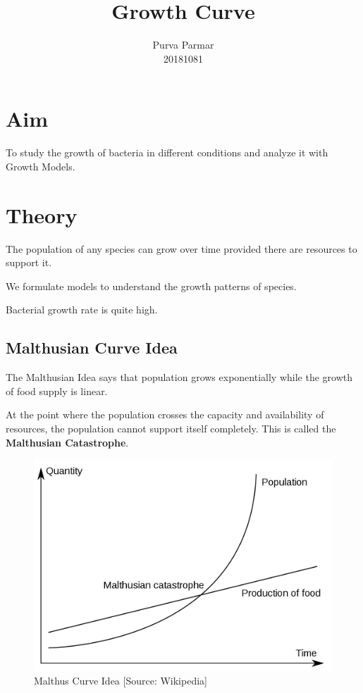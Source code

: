 \documentclass[twocolumn]{article}
\title{Growth Curve}
\author{Purva Parmar \\ 20181081}
\date{}
\begin{document}
\graphicspath{{../}}
\setlength{\parindent}{0pt}
\setlength{\parskip}{\baselineskip}

\maketitle

\section{Aim}

To study the growth of bacteria in different conditions and analyze it with Growth Models.

\section{Theory}

The population of any species can grow over time provided there are resources to support it. 

We formulate models to understand the growth patterns of species. 

Bacterial growth rate is quite high. 

\subsection{Malthusian Curve Idea}

The Malthusian Idea says that population grows exponentially while the growth of food supply is linear. 

At the point where the population crosses the capacity and availability of resources, the population cannot support itself completely. This is called the \textbf{Malthusian Catastrophe}.

\begin{figure}[h]
\includegraphics[width = \linewidth]{Malthus.png}
\caption{Malthus Curve Idea [Source: Wikipedia]}
\end{figure}
\end{document}

